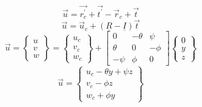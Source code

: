 \begin{equation}\label{eq:DispVectorrptprt}
\vec{u}=\vec{r_c^\prime}+\vec{t^\prime}-\vec{r}_c+\vec{t}
\end{equation}
\begin{equation}\label{eq:DispVectRotTranst}
\vec{u}=\vec{u}_c+(\underline{R}-\underline{I})\vec{t}
\end{equation}
\begin{equation}\label{DispVectExpanded}
\vec{u} = \left\{\begin{array}{c}
	u\\
	v\\
	w\end{array}\right\}=\left\{\begin{array}{c}
	u_c\\
	v_c\\
	w_c\end{array}\right\}+\left[\begin{array}{ccc}
	0&-\theta&\psi\\
	\theta&0&-\phi\\
	-\psi&\phi&0
	\end{array}\right]\left\{\begin{array}{c}
	0\\
	y\\
	z\end{array}\right\}
\end{equation}
\begin{equation}\label{eq:}
\vec{u}=\left\{\begin{array}{c}
u_c-\theta y+\psi z\\
v_c-\phi z\\
w_c+\phi y\end{array}\right\}
\end{equation}

